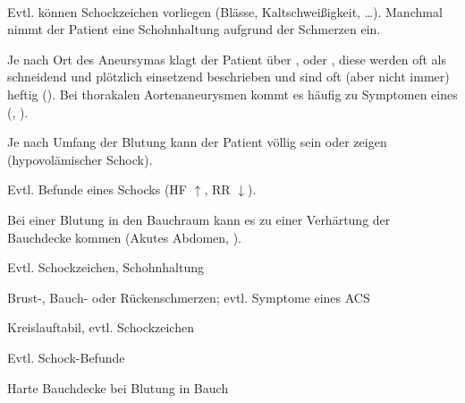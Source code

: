 \documentclass[
ngerman,
paper=a4,
asymmetric,
fontsize=10pt,
draft=false,
numbers=noenddot,
bibtotocnumbered,
footnotes=multiple,
]{scrreprt}
\begin{document}
\TextSlide
{\TxABCDE}
{~
\begin{ABCDEText}
  \item[\ABCDE{Eindruck}] Evtl. können
  Schockzeichen vorliegen (Blässe, Kaltschweißigkeit,
  \ldots).
  Manchmal nimmt der Patient eine Schohnhaltung aufgrund der Schmerzen ein.
  \item[\ABCDE{Hauptbeschwerde}] Je nach Ort des
  Aneursymas klagt der Patient über , 
  oder , diese werden oft als schneidend
  und plötzlich einsetzend beschrieben und sind oft (aber nicht immer) heftig
  (). Bei thorakalen
  Aortenaneurysmen kommt es häufig zu Symptomen eines
   (, ).
  \item[\ABCDE{C}] Je nach Umfang der Blutung kann
  der Patient völlig  sein oder
   zeigen (hypovolämischer Schock).
  \item[\ABCDE{D}] Evtl. Befunde eines Schocks (HF
  $\uparrow$, RR $\downarrow$).
  \item[\ABCDE{E}] Bei einer Blutung in den Bauchraum 
  kann es zu einer Verhärtung 
  der Bauchdecke kommen (Akutes Abdomen, 
  ). 
\end{ABCDEText}
}
{
\begin{ABCDESlide}
  \item[\ABCDE{Ei}] Evtl. Schockzeichen, Schohnhaltung
  \item[\ABCDE{Hb}] Brust-, Bauch- oder Rückenschmerzen;
  evtl. Symptome eines ACS
  \item[\ABCDE{C}] Kreislauftabil, evtl. Schockzeichen
  \item[\ABCDE{D}] Evtl. Schock-Befunde
  \item[\ABCDE{E}] Harte Bauchdecke bei Blutung in Bauch
\end{ABCDESlide}
}
{}
{}
{}{}
\end{document}
